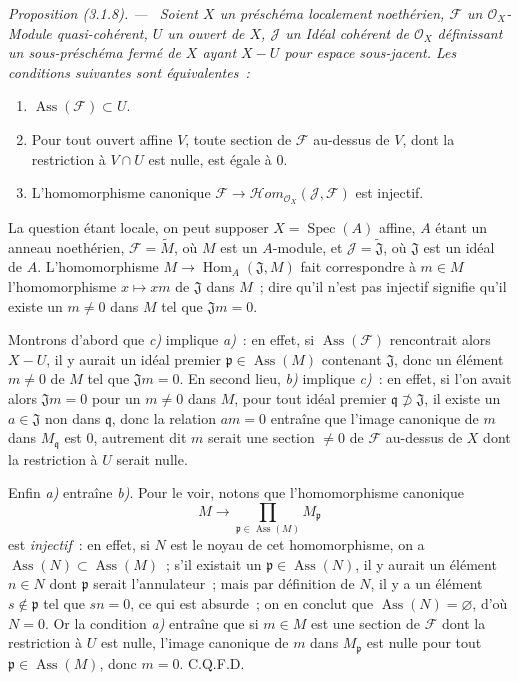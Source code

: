 \documentclass[10pt,oneside]{book}
\newenvironment{proposition}[1][]{%
  \par\medskip\noindent\itshape Proposition (#1). ---\ }{\par}
\begin{document}
\begin{proposition}[3.1.8]
\label{IV.2.3.1.8-fr}
Soient $X$ un préschéma localement noethérien, $\mathcal F$ un
$\mathcal O_X$-Module quasi-cohérent, $U$ un ouvert de $X$, $\mathcal J$ un
Idéal cohérent de $\mathcal O_X$ définissant un sous-préschéma fermé de $X$
ayant $X-U$ pour espace sous-jacent. Les conditions suivantes sont
équivalentes~:
\begin{enumerate}
\item[\emph{a)}] $\operatorname{Ass}(\mathcal F)\subset U$.
\item[\emph{b)}] Pour tout ouvert affine $V$, toute section de $\mathcal F$
au-dessus de $V$, dont la restriction à $V\cap U$ est nulle, est égale à $0$.
\item[\emph{c)}] L'homomorphisme canonique
$\mathcal F\to\mathcal Hom_{\mathcal O_X}(\mathcal J,\mathcal F)$ est
injectif.
\end{enumerate}
\end{proposition}

La question étant locale, on peut supposer $X=\operatorname{Spec}(A)$ affine,
$A$ étant un anneau noethérien, $\mathcal F=\widetilde M$, où $M$ est un
$A$-module, et $\mathcal J=\widetilde{\mathfrak J}$, où $\mathfrak J$ est un
idéal de $A$. L'homomorphisme $M\to\operatorname{Hom}_A(\mathfrak J,M)$ fait
correspondre à $m\in M$ l'homomorphisme $x\mapsto xm$ de $\mathfrak J$ dans
$M$~; dire qu'il n'est pas injectif signifie qu'il existe un $m\ne0$ dans
$M$ tel que $\mathfrak Jm=0$.

Montrons d'abord que \emph{c)} implique \emph{a)}~: en effet, si
$\operatorname{Ass}(\mathcal F)$ rencontrait alors $X-U$, il y aurait un
idéal premier $\mathfrak p\in\operatorname{Ass}(M)$ contenant $\mathfrak J$,
donc un élément $m\ne0$ de $M$ tel que $\mathfrak Jm=0$. En second lieu,
\emph{b)} implique \emph{c)}~: en effet, si l'on avait alors
$\mathfrak Jm=0$ pour un $m\ne0$ dans $M$, pour tout idéal premier
$\mathfrak q\not\supset\mathfrak J$, il existe un $a\in\mathfrak J$ non dans
$\mathfrak q$, donc la relation $am=0$ entraîne que l'image canonique de $m$
dans $M_\mathfrak q$ est $0$, autrement dit $m$ serait une section $\ne0$ de
$\mathcal F$ au-dessus de $X$ dont la restriction à $U$ serait nulle.

Enfin \emph{a)} entraîne \emph{b)}. Pour le voir, notons que l'homomorphisme
canonique
\[
M\longrightarrow\prod_{\mathfrak p\in\operatorname{Ass}(M)}M_\mathfrak p
\]
est \emph{injectif}~: en effet, si $N$ est le noyau de cet homomorphisme, on a
$\operatorname{Ass}(N)\subset\operatorname{Ass}(M)$~; s'il existait un
$\mathfrak p\in\operatorname{Ass}(N)$, il y aurait un élément $n\in N$ dont
$\mathfrak p$ serait l'annulateur~; mais par définition de $N$, il y a un
élément $s\notin\mathfrak p$ tel que $sn=0$, ce qui est absurde~; on en conclut
que $\operatorname{Ass}(N)=\varnothing$, d'où $N=0$. Or la condition
\emph{a)} entraîne que si $m\in M$ est une section de $\mathcal F$ dont la
restriction à $U$ est nulle, l'image canonique de $m$ dans $M_\mathfrak p$ est
nulle pour tout $\mathfrak p\in\operatorname{Ass}(M)$, donc $m=0$. C.Q.F.D.
\end{document}
